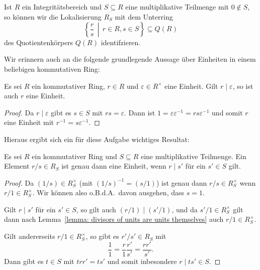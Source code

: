 \documentclass[a4paper,10pt,numbers=noenddot]{scrartcl}
\begin{document}
\begin{remark}
  \label{remark: everythin lives in the quotient fields}
  Ist $R$ ein Integritätsbereich und $S \subseteq R$ eine multiplikative Teilmenge mit $0 \notin S$, so können wir die Lokalisierung $R_S$ mit dem Unterring
  \[
    \left\{ \frac{r}{s} \,\middle|\, r \in R, s \in S \right\}
    \subseteq Q(R)
  \]
  des Quotientenkörpers $Q(R)$ identifzieren.
\end{remark}

Wir erinnern auch an die folgende grundlegende Aussage über Einheiten in einem beliebigen kommutativen Ring:

\begin{lemma}
  \label{lemma: divisors of units are units themselves}
  Es sei $R$ ein kommutativer Ring, $r \in R$ und $\varepsilon \in R^\times$ eine Einheit.
  Gilt $r \mid \varepsilon$, so ist auch $r$ eine Einheit.
\end{lemma}
\begin{proof}
  Da $r \mid \varepsilon$ gibt es $s \in S$ mit $rs = \varepsilon$.
  Dann ist $1 = \varepsilon \varepsilon^{-1} = r s \varepsilon^{-1}$ und somit $r$ eine Einheit mit $r^{-1} = s \varepsilon^{-1}$.
\end{proof}

Hieraus ergibt sich ein für diese Aufgabe wichtiges Resultat:

\begin{claim}
  \label{claim: divisors become units in the localization}
  Es sei $R$ ein kommutativer Ring und $S \subseteq R$ eine multiplikative Teilmenge.
  Ein Element $r/s \in R_S$ ist genau dann eine Einheit, wenn $r \mid s'$ für ein $s' \in S$ gilt.
\end{claim}
\begin{proof}
  Da $(1/s) \in R_S^{\times}$ (mit $(1/s)^{-1} = (s/1)$) ist genau dann $r/s \in R_S^\times$ wenn $r/1 \in R_S^\times$.
  Wir können also o.B.d.A.\ davon ausgehen, dass $s = 1$.
  
  Gilt $r \mid s'$ für ein $s' \in S$, so gilt auch $(r/1) \mid (s'/1)$, und da $s'/1 \in R_S^{\times}$ gilt dann nach Lemma~\ref{lemma: divisors of units are units themselves} auch $r/1 \in R_S^{\times}$.
  
  Gilt andererseits $r/1 \in R_S^\times$, so gibt es $r'/s' \in R_S$ mit
  \[
      \frac{1}{1}
    = \frac{r}{1} \frac{r'}{s'}
    = \frac{r r'}{s'}.
  \]
  Dann gibt es $t \in S$ mit $t r r' = t s'$ und somit inbesondere $r \mid t s' \in S$.
\end{proof}
\end{document}
